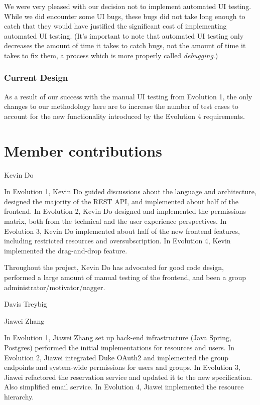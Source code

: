 \documentclass[12pt]{article}
\begin{document}
We were very pleased with our decision not to implement automated UI testing. While we did encounter some UI bugs, these bugs did not take long enough to catch that they would have justified the significant cost of implementing automated UI testing. (It's important to note that automated UI testing only decreases the amount of time it takes to catch bugs, not the amount of time it takes to fix them, a process which is more properly called \emph{debugging}.)

\subsubsection{Current Design}
As a result of our success with the manual UI testing from Evolution 1, the only changes to our methodology here are to increase the number of test cases to account for the new functionality introduced by the Evolution 4 requirements.

\section{Member contributions}

Kevin Do 

In Evolution 1, Kevin Do guided discussions about the language and architecture, designed the majority of the REST API, and implemented about half of the frontend. In Evolution 2, Kevin Do designed and implemented the permissions matrix, both from the technical and the user experience perspectives. In Evolution 3, Kevin Do implemented about half of the new frontend features, including restricted resources and oversubscription. In Evolution 4, Kevin implemented the drag-and-drop feature.

Throughout the project, Kevin Do has advocated for good code design, performed a large amount of manual testing of the frontend, and been a group administrator/motivator/nagger.

Davis Treybig

Jiawei Zhang

In Evolution 1, Jiawei Zhang set up back-end infrastructure (Java Spring, Postgres) performed the initial implementations for resources and users. In Evolution 2, Jiawei integrated Duke OAuth2 and implemented the group endpoints and system-wide permissions for users and groups. In Evolution 3, Jiawei refactored the reservation service and updated it to the new specification. Also simplified email service. In Evolution 4, Jiawei implemented the resource hierarchy. 
\end{document}
